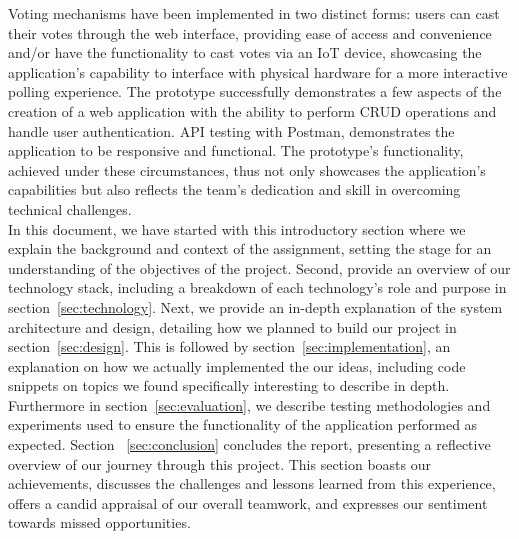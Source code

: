 \noindent Voting mechanisms have been implemented in two distinct forms: users can cast their votes through the web interface, providing ease of access and convenience and/or  have the functionality to cast votes via an IoT device, showcasing the application's capability to interface with physical hardware for a more interactive polling experience.  The prototype successfully demonstrates a few aspects of the creation of a web application with the ability to perform CRUD operations and handle user authentication.  API testing with Postman, demonstrates the application to be responsive and functional. The prototype's functionality, achieved under these circumstances, thus not only showcases the application's capabilities but also reflects the team's dedication and skill in overcoming technical challenges.\\



\noindent In this document, we have started with this introductory section where we explain the background and context of the assignment, setting the stage for an understanding of the objectives of the project.  Second, provide an overview of our technology stack, including a breakdown of each technology's role and purpose in section~\ref{sec:technology}.  Next, we provide an in-depth explanation of the system architecture and design, detailing how we planned to build our project in section~\ref{sec:design}.  This is followed by section~\ref{sec:implementation}, an explanation on how we actually implemented the our ideas, including code snippets on topics we found specifically interesting to describe in depth.  Furthermore in section~\ref{sec:evaluation}, we describe testing methodologies and experiments used to ensure the functionality of the application performed as expected.  Section ~\ref{sec:conclusion} concludes the report, presenting a reflective overview of our journey through this project. This section boasts our achievements, discusses the challenges and lessons learned from this experience, offers a candid appraisal of our overall teamwork, and expresses our sentiment towards missed opportunities.


